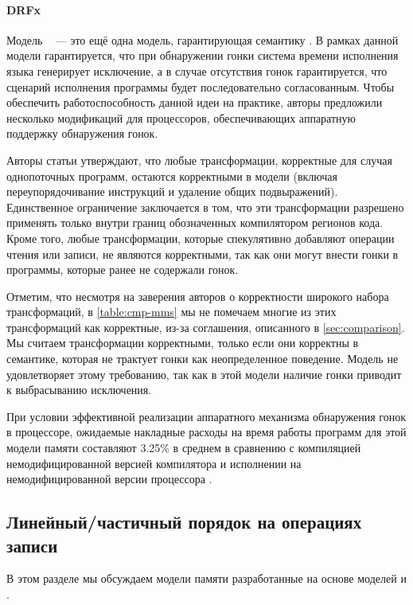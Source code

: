 \paragraph{DRFx}

Модель \DRFx~\cite{Marino-al:PLDI10, Marino-al:TOPLAS2016} --- 
это ещё одна модель, гарантирующая семантику \SC.
В рамках данной модели гарантируется, что 
при обнаружении гонки система времени исполнения языка
генерирует исключение, а в случае отсутствия гонок 
гарантируется, что сценарий исполнения программы будет последовательно согласованным.
Чтобы обеспечить работоспособность данной идеи на практике,
авторы предложили несколько модификаций для процессоров, 
обеспечивающих аппаратную поддержку обнаружения гонок.   

Авторы статьи утверждают, что любые трансформации, 
корректные для случая однопоточных программ, 
остаются корректными в модели \DRFx
(включая переупорядочивание инструкций и удаление общих подвыражений).
Единственное ограничение заключается в том, что 
эти трансформации разрешено применять только 
внутри границ обозначенных компилятором регионов кода. 
Кроме того, любые трансформации, которые спекулятивно
добавляют операции чтения или записи, 
не являются корректными, 
так как они могут внести гонки в программы, 
которые ранее не содержали гонок.  

Отметим, что несмотря на заверения авторов о корректности широкого набора трансформаций, 
в \cref{table:cmp-mms} мы не помечаем многие из этих трансформаций как корректные, 
из-за соглашения, описанного в \cref{sec:comparison}.
Мы считаем трансформации корректными, только если 
они корректны в семантике, которая не трактует 
гонки как неопределенное поведение. 
Модель \DRFx не удовлетворяет этому требованию, 
так как в этой модели наличие гонки приводит 
к выбрасыванию исключения. 

При условии эффективной реализации 
аппаратного механизма обнаружения гонок в процессоре, 
ожидаемые накладные расходы на время работы программ 
для этой модели памяти составляют 3.25\% в среднем
в сравнению с компиляцией немодифицированной версией компилятора
и исполнении на немодифицированной версии процессора \Intel.

\subsection{Линейный/частичный порядок на операциях записи}

В этом разделе мы обсуждаем модели памяти 
разработанные на основе моделей \TSO и \PSO.

